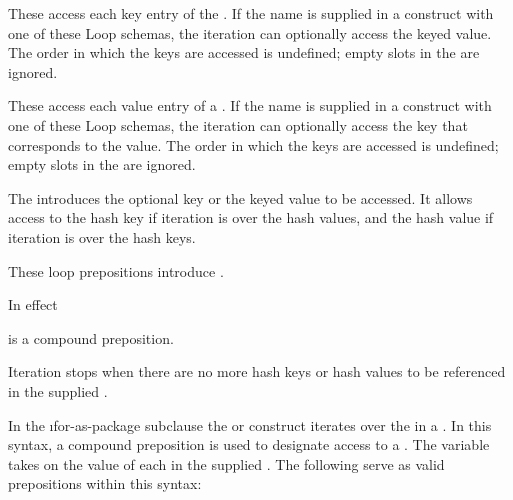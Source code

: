  
These  access each key entry of the .  If 
the name  is supplied in a  construct with one
of these Loop schemas, the iteration can optionally access the keyed
value. The order in which the keys are accessed is undefined; empty
slots in the  are ignored.  
 
 
These  access each value entry of a 
.  If 
the name  is supplied in a  construct with one of
these Loop schemas, the iteration can optionally access the key that
corresponds to the value.  The order in which the keys are accessed is
undefined; empty slots in the  are ignored. 
 
 
The   introduces 
the optional key or the keyed value to
be accessed.  It allows access to the hash key if iteration is over
the hash values, and the hash value if 
iteration is over the hash keys.
 
 
These loop prepositions introduce .
 
\endlist

In effect 



is a compound preposition.
 
Iteration stops when there are no more hash keys or hash values to be
referenced in the supplied .

\endsubsubsubsection%


In the \i{for-as-package} subclause
the  
or  construct                    
iterates over the  in a .
In this syntax, a compound preposition is used to designate access to a
.
The variable  takes on the value of each 
in the supplied .  
 The following  serve as valid prepositions within this syntax:
 
